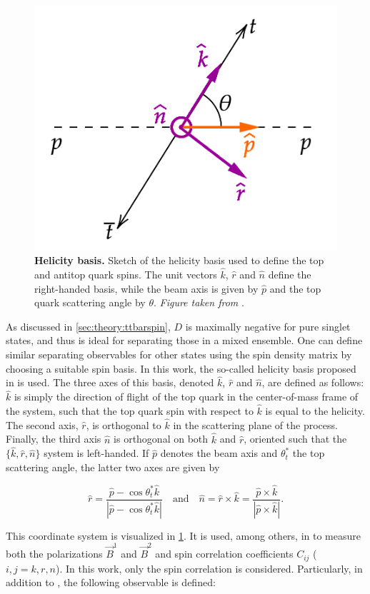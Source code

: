 \begin{figure}[t]
  \centering
  \includegraphics[width=0.5\linewidth]{figures/helicity_basis.png}
  \caption{\textbf{Helicity basis.} Sketch of the helicity basis used to define the top and antitop quark spins. The unit vectors $\hat{k}$, $\hat{r}$ and $\hat{n}$ define the right-handed basis, while the beam axis is given by $\hat{p}$ and the top quark scattering angle by $\theta$. \textit{Figure taken from }.}
  \label{fig:theory:helicitybasis}
\end{figure}

As discussed in \cref{sec:theory:ttbarspin}, $D$ is maximally negative for pure singlet states, and thus is ideal for separating those in a mixed ensemble. One can define similar separating observables for other states using the spin density matrix by choosing a suitable spin basis. In this work, the so-called helicity basis proposed in  is used. The three axes of this basis, denoted $\hat{k}$, $\hat{r}$ and $\hat{n}$, are defined as follows: $\hat{k}$ is simply the direction of flight of the top quark in the center-of-mass frame of the \ttbar system, such that the top quark spin with respect to $\hat{k}$ is equal to the helicity. The second axis, $\hat{r}$, is orthogonal to $\hat{k}$ in the scattering plane of the \pptt process. Finally, the third axis $\hat{n}$ is orthogonal on both $\hat{k}$ and $\hat{r}$, oriented such that the $\{\hat{k},\hat{r},\hat{n}\}$ system is left-handed. If $\hat{p}$ denotes the beam axis and $\theta^*_t$ the top scattering angle, the latter two axes are given by

\begin{equation}
    \hat{r} = \frac{\hat{p} - \cos \theta^*_t \hat{k}} {| \hat{p} - \cos \theta^*_t \hat{k} |} \quad \mathrm{and} \quad \hat{n} = \hat{r} \times \hat{k} = \frac{\hat{p} \times \hat{k}} {| \hat{p} \times \hat{k} |}.
\end{equation}

This coordinate system is visualized in \cref{fig:theory:helicitybasis}. It is used, among others, in  to measure both the polarizations $\vec{B}^1$ and $\vec{B}^2$ and spin correlation coefficients $C_{ij}$ ($i,j = k,r,n$). In this work, only the spin correlation is considered. Particularly, in addition to \chel, the following observable is defined:

